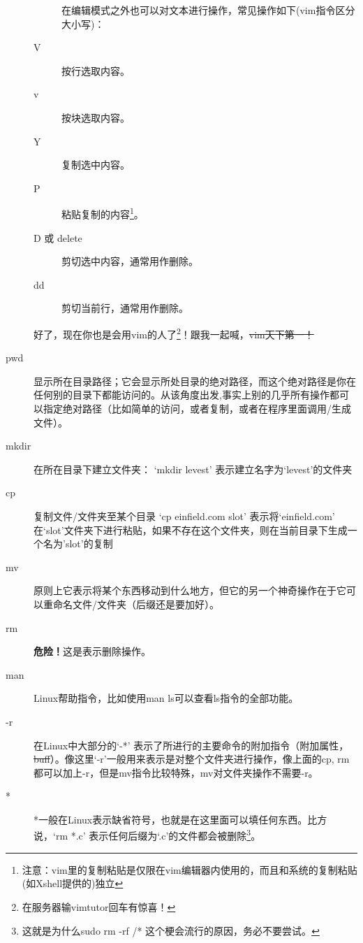 \documentclass[12pt,a4paper,openany,twoside]{book}
\numberwithin{equation}{section}
\begin{document}
\begin{description}
\begin{description}
      在编辑模式之外也可以对文本进行操作，常见操作如下(vim指令区分大小写)：
      \item[V] 按行选取内容。
      \item[v] 按块选取内容。
      \item[Y] 复制选中内容。
      \item[P] 粘贴复制的内容\footnote{注意：vim里的复制粘贴是仅限在vim编辑器内使用的，而且和系统的复制粘贴(如Xshell提供的)独立}。
      \item[D 或 delete] 剪切选中内容，通常用作删除。
      \item[dd] 剪切当前行，通常用作删除。
    \end{description}
    好了，现在你也是会用vim的人了\footnote{在服务器输vimtutor回车有惊喜！}！跟我一起喊，\sout{vim天下第一！}
    \item[pwd]
      显示所在目录路径；它会显示所处目录的绝对路径，而这个绝对路径是你在任何别的目录下都能访问的。从该角度出发,事实上别的几乎所有操作都可以指定绝对路径（比如简单的访问，或者复制，或者在程序里面调用/生成文件）。

    \item[mkdir]
      在所在目录下建立文件夹：
      `mkdir levest' 表示建立名字为`levest'的文件夹

    \item[cp] 复制文件/文件夹至某个目录
      `cp einfield.com slot' 表示将`einfield.com' 在`slot'文件夹下进行粘贴，如果不存在这个文件夹，则在当前目录下生成一个名为'slot'的复制

    \item[mv] 原则上它表示将某个东西移动到什么地方，但它的另一个神奇操作在于它可以重命名文件/文件夹（后缀还是要加好）。

    \item[rm] \textbf{ 危险！}这是表示删除操作。
    
    \item[man] Linux帮助指令，比如使用man ls可以查看ls指令的全部功能。

    \item[-r] 在Linux中大部分的`-*' 表示了所进行的主要命令的附加指令（附加属性，\sout{buff}）。像这里`-r'一般用来表示是对整个文件夹进行操作，像上面的cp, rm 都可以加上-r，但是mv指令比较特殊，mv对文件夹操作不需要-r。

    \item[*] *一般在Linux表示缺省符号，也就是在这里面可以填任何东西。比方说，`rm *.c' 表示任何后缀为`.c'的文件都会被删除\footnote{这就是为什么sudo rm -rf /* 这个梗会流行的原因，务必不要尝试。}。

    \end{description}
\end{document}
